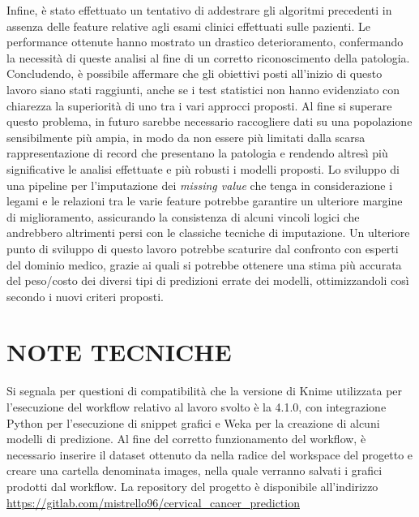 Infine, è stato effettuato un tentativo di addestrare gli algoritmi precedenti in assenza delle feature relative agli esami clinici effettuati sulle pazienti. Le performance ottenute hanno mostrato un drastico deterioramento, confermando la necessità di queste analisi al fine di un corretto riconoscimento della patologia.
Concludendo, è possibile affermare che gli obiettivi posti all'inizio di questo lavoro siano stati raggiunti, anche se i test statistici non hanno evidenziato con chiarezza la superiorità di uno tra i vari approcci proposti.
Al fine si superare questo problema, in futuro sarebbe necessario raccogliere dati su una popolazione sensibilmente più ampia, in modo da non essere più limitati dalla scarsa rappresentazione di record che presentano la patologia e rendendo altresì più significative le analisi effettuate e più robusti i modelli proposti.
Lo sviluppo di una pipeline per l'imputazione dei \textit{missing value} che tenga in considerazione i legami e le relazioni tra le varie feature potrebbe garantire un ulteriore margine di miglioramento, assicurando la consistenza di alcuni vincoli logici che andrebbero altrimenti persi con le classiche tecniche di imputazione.
Un ulteriore punto di sviluppo di questo lavoro potrebbe scaturire dal confronto con esperti del dominio medico, grazie ai quali si potrebbe ottenere una stima più accurata del peso/costo dei diversi tipi di predizioni errate dei modelli, ottimizzandoli così secondo i nuovi criteri proposti.

\section*{NOTE TECNICHE}
Si segnala per questioni di compatibilità che la versione di Knime utilizzata per l'esecuzione del workflow relativo al lavoro svolto è la 4.1.0, con integrazione Python per l'esecuzione di snippet grafici e Weka per la creazione di alcuni modelli di predizione.
Al fine del corretto funzionamento del workflow, è necessario inserire il dataset ottenuto da \cite{ML} nella radice del workspace del progetto e creare una cartella denominata images, nella quale verranno salvati i grafici prodotti dal workflow.
La repository del progetto è disponibile all'indirizzo\\\url{https://gitlab.com/mistrello96/cervical_cancer_prediction}